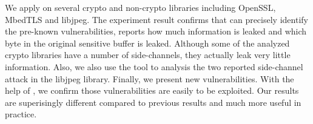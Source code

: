 


We apply \tool{} on several crypto and non-crypto libraries including OpenSSL,
MbedTLS and libjpeg. The experiment result confirms that \tool{} can precisely identify the pre-known vulnerabilities,
reports how much information is leaked and which byte in the original sensitive buffer is leaked. 
Although some of the analyzed crypto libraries have a number of side-channels, they actually
leak very little information. Also, we also use the tool to analysis the two reported side-channel attack 
in the libjpeg library. Finally, we present new vulnerabilities. With the help of \tool{}, we confirm those
vulnerabilities are easily to be exploited. Our results are superisingly different compared to previous results
and much more useful in practice.

